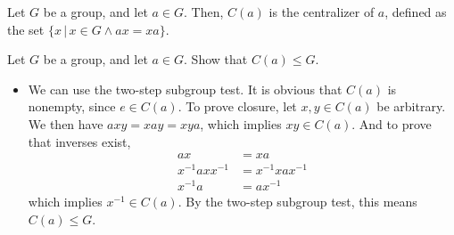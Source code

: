     \begin{dfn}[Centralizer]
        Let \(G\) be a group, and let \(a\in G\). Then, \(C(a)\) is the centralizer of \(a\), defined as the set \(\{x\,|\, x\in G \land ax = xa\}\).
    \end{dfn}

    \begin{example}
        Let \(G\) be a group, and let \(a\in G\). Show that \(C(a) \leq G\).

        \begin{itemize}
            \item We can use the two-step subgroup test. It is obvious that \(C(a)\) is nonempty, since \(e\in C(a)\). To prove closure, let \(x,y\in C(a)\) be arbitrary. We then have \(axy = xay = xya\), which implies \(xy\in C(a)\). And to prove that inverses exist, 
            \begin{align*}
                ax &= xa \\
                x^{-1}axx^{-1} &= x^{-1}xax^{-1} \\
                x^{-1}a &= ax^{-1}
            \end{align*}
            which implies \(x^{-1}\in C(a)\). By the two-step subgroup test, this means \(C(a) \leq G\).
        \end{itemize}
    \end{example}